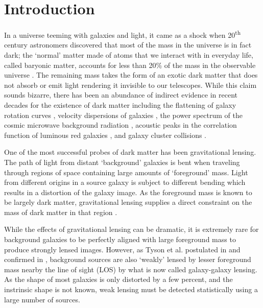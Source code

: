 \documentclass[%
 reprint,
 amsmath,amssymb,
 aps,nofootinbib
]{revtex4-1}
\begin{document}
\maketitle



\section{Introduction}

In a universe teeming with galaxies and light, it came as a shock when 20\textsuperscript{th} century astronomers discovered that most of the mass in the universe is in fact dark; the `normal' matter made of atoms that we interact with in everyday life, called baryonic matter, accounts for less than 20\% of the mass in the observable universe \cite{planck_2015}. The remaining mass takes the form of an exotic dark matter that does not absorb or emit light rendering it invisible to our telescopes. While this claim sounds bizarre, there has been an abundance of indirect evidence in recent decades for the existence of dark matter including the flattening of galaxy rotation curves \cite{rotation_curve}, velocity dispersions of galaxies \cite{zwicky}, the power spectrum of the cosmic microwave background radiation \cite{planck_2015}, acoustic peaks in the correlation function of luminous red galaxies \cite{bao_detection}, and galaxy cluster collisions \cite{bullet_cluster}.

One of the most successful probes of dark matter has been gravitational lensing. The path of light from distant `background' galaxies is bent when traveling through regions of space containing large amounts of `foreground' mass. Light from different origins in a source galaxy is subject to different bending which results in a distortion of the galaxy image. As the foreground mass is known to be largely dark matter, gravitational lensing supplies a direct constraint on the mass of dark matter in that region \cite{dark_matter_probe}.

While the effects of gravitational lensing can be dramatic, it is extremely rare for background galaxies to be perfectly aligned with large foreground mass to produce strongly lensed images. However, as Tyson et al. postulated in \cite{tyson_postulate} and confirmed in \cite{tyson_confirm}, background sources are also `weakly' lensed by lesser foreground mass nearby the line of sight (LOS) by what is now called galaxy-galaxy lensing. As the shape of most galaxies is only distorted by a few percent, and the instrinsic shape is not known, weak lensing must be detected statistically using a large number of sources.
\end{document}
